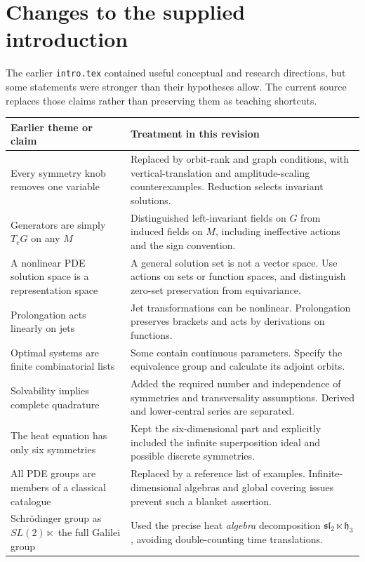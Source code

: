 \documentclass[11pt,a4paper]{article}
\numberwithin{equation}{section}
\theoremstyle{definition}
\theoremstyle{plain}
\theoremstyle{remark}
\begin{document}
\section{Changes to the supplied introduction}\label{app:intro-errors}
The earlier \texttt{intro.tex} contained useful conceptual and research directions, but some statements were stronger than their hypotheses allow. The current source replaces those claims rather than preserving them as teaching shortcuts.
\begin{longtable}{@{}>{\raggedright\arraybackslash}p{.35\linewidth}>{\raggedright\arraybackslash}p{.59\linewidth}@{}}
\toprule Earlier theme or claim & Treatment in this revision \\
\midrule\endhead
Every symmetry knob removes one variable & Replaced by orbit-rank and graph conditions, with vertical-translation and amplitude-scaling counterexamples. Reduction selects invariant solutions.\\
Generators are simply $T_eG$ on any $M$ & Distinguished left-invariant fields on $G$ from induced fields on $M$, including ineffective actions and the sign convention.\\
A nonlinear PDE solution space is a representation space & A general solution set is not a vector space. Use actions on sets or function spaces, and distinguish zero-set preservation from equivariance.\\
Prolongation acts linearly on jets & Jet transformations can be nonlinear. Prolongation preserves brackets and acts by derivations on functions.\\
Optimal systems are finite combinatorial lists & Some contain continuous parameters. Specify the equivalence group and calculate its adjoint orbits.\\
Solvability implies complete quadrature & Added the required number and independence of symmetries and transversality assumptions. Derived and lower-central series are separated.\\
The heat equation has only six symmetries & Kept the six-dimensional part and explicitly included the infinite superposition ideal and possible discrete symmetries.\\
All PDE groups are members of a classical catalogue & Replaced by a reference list of examples. Infinite-dimensional algebras and global covering issues prevent such a blanket assertion.\\
Schr\"odinger group as $SL(2)\ltimes$ the full Galilei group & Used the precise heat \emph{algebra} decomposition $\mathfrak{sl}_2\ltimes\mathfrak h_3$, avoiding double-counting time translations.\\

\end{longtable}
\end{document}
